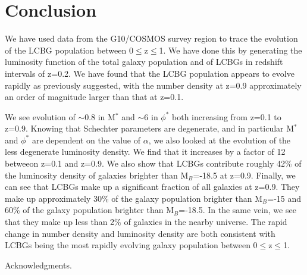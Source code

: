 \documentclass[manuscript]{aastex61}
\begin{document}
\section{Conclusion}\label{sec:Conc}
We have used data from the G10/COSMOS survey region to trace the evolution of the LCBG population between 0$\leq$z$\leq$1. We have done this by generating the luminosity function of the total galaxy population and of LCBGs in redshift intervals of z=0.2. We have found that the LCBG population appears to evolve rapidly as previously suggested, with the number density at z=0.9 approximately an order of magnitude larger than that at z=0.1. 

We see evolution of $\sim$0.8 in M$^{*}$ and $\sim$6 in $\phi^{*}$ both increasing from z=0.1 to z=0.9. Knowing that Schechter parameters are degenerate, and in particular M$^{*}$ and $\phi^{*}$ are dependent on the value of $\alpha$, we also looked at the evolution of the less degenerate luminosity density. We find that it increases  by a factor of 12 betweeon z=0.1 and z=0.9. We also show that LCBGs contribute roughly 42\% of the luminosity density of galaxies brighter than M$_{B}$=-18.5 at z=0.9. Finally, we can see that LCBGs make up a significant fraction of all galaxies at z=0.9. They make up approximately 30\% of the galaxy population brighter than M$_{B}$=-15 and 60\% of the galaxy population brighter than M$_{B}$=-18.5. In the same vein, we see that they make up less than 2\% of galaxies in the nearby universe. The rapid change in number density and luminosity density are both consistent with LCBGs being the most rapidly evolving galaxy population between 0$\leq$z$\leq$1.




\acknowledgments
Acknowledgments.
\end{document}
